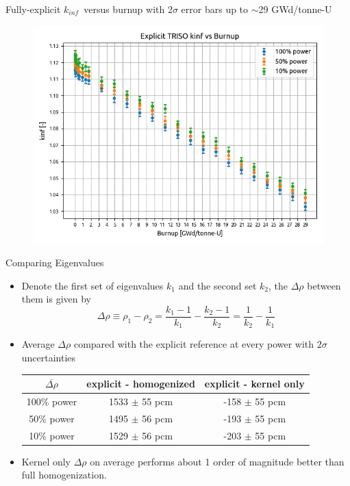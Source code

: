 \documentclass[9pt,t,aspectratio=169]{beamer}
\newcommand{\kinf}{$k_{inf}$}
\begin{document}
\begin{frame}{Fully-explicit \kinf~versus burnup with $2\sigma$ error bars up to $\sim$29 GWd/tonne-U}
    \begin{figure}
        \vspace*{-0.4cm}
        \centering
            \includegraphics[height=0.9\textheight]{figures/expl_kinf_vs_bu.png}
        \label{fig:kinf_full_explicit_results}
    \end{figure}
\end{frame}

\begin{frame}{Comparing Eigenvalues}
    \Large
    \begin{itemize}
        \item Denote the first set of eigenvalues $k_ 1$ and the second set $k_2$, the $\Delta \rho$ between them is given by
        \begin{equation}
            \Delta \rho \equiv
            \rho_1 - \rho_2 =
            \frac{k_1-1}{k_1} - \frac{k_2 - 1 }{k_2} =
            \frac{1}{k_2} - \frac{1}{k_1}
        \end{equation}
        \item Average $\Delta \rho$ compared with the explicit reference at every power with $2\sigma$ uncertainties
        \begin{table}[!h]
            \centering
            \begin{tabular}{c|c|c}
            $\overline{\Delta \rho}$ & explicit - homogenized & explicit - kernel only \\ \hline
            100\% power & 1533 $\pm$ 55 pcm &  -158 $\pm$ 55 pcm \\
            50\% power & 1495 $\pm$ 56 pcm & -193 $\pm$ 55 pcm\\
            10\% power & 1529 $\pm$ 56 pcm  & -203 $\pm$ 55 pcm
            \end{tabular}
            \label{tab:average_pcms}
        \end{table}
    \item Kernel only $\Delta \rho$ on average performs about 1 order of magnitude better than full homogenization.
    \end{itemize}
    \normalsize
\end{frame}
\end{document}

